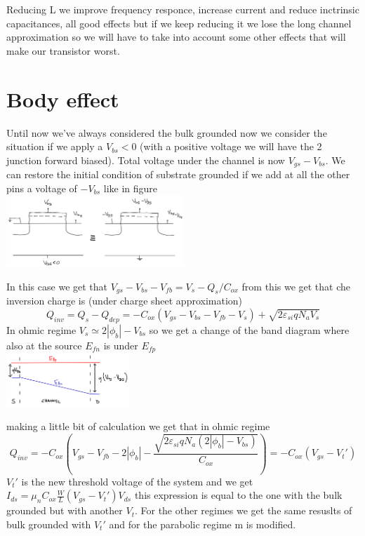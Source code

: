 Reducing L we improve frequency responce, increase current and reduce inctrinsic capacitances, all good effects but if we keep reducing it we lose the long channel approximation so we will have to take into account some other effects that will make our transistor worst.\\

\section{Body effect}
Until now we've always considered the bulk grounded now we consider the situation if we apply a $V_{bs}<0$ (with a positive voltage we will have the 2 junction forward biased). Total voltage under the channel is now $V_{gs}-V_{bs}$. We can restore the initial condition of substrate grounded if we add at all the other pins a voltage of $-V_{bs}$ like in figure\\

\centering
\includegraphics[width=0.5\textwidth]{body1.png}\\
\raggedright

In this case we get that $V_{gs}-V_{bs}-V_{fb}=V_s-Q_s/C_{ox}$ from this we get that che inversion charge is (under charge sheet approximation) 
\begin{equation}
Q_{inv}=Q_s-Q_{dep}=-C_{ox}(V_{gs}-V_{bs}-V_{fb}-V_s)+\sqrt{2\varepsilon_{si}qN_aV_s}
\end{equation}
In ohmic regime $V_s\simeq 2|\phi_b|-V_{bs}$ so we get a change of the band diagram where also at the source $E_{fn}$ is under $E_{fp}$ \\

\centering
\includegraphics[width=0.35\textwidth]{body2.png}\\
\raggedright

making a little bit of calculation we get that in ohmic regime
\begin{equation}
Q_{inv}=-C_{ox}(V_{gs}-V_{fb}-2|\phi_b|-\frac{\sqrt{2\varepsilon_{si}qN_a(2|\phi_b|-V_{bs})}}{C_{ox}})=-C_{ox}(V_{gs}-V_t')
\end{equation}
$V_t'$ is the new threshold voltage of the system and we get $I_{ds}=\mu_nC_{ox}\frac{W}{L}(V_{gs}-V_t')V_{ds}$ this expression is equal to the one with the bulk grounded but with another $V_t$. For the other regimes we get the same resuslts of bulk grounded with $V_t'$ and for the parabolic regime m is modified.\\


